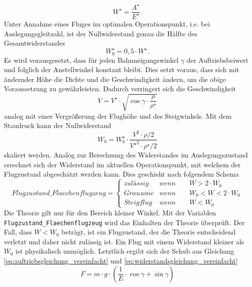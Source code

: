 \begin{equation}
	W^\star = \frac{A^\star}{E^\star} .
\end{equation}
Unter Annahme eines Fluges im optimalen Operationspunkt, i.e. bei Auslegungsgleitzahl, ist der Nullwiderstand genau die Hälfte des Gesamtwiderstandes
\begin{equation}
	W_0^\star = 0,5\cdot W^\star .
\end{equation}
Es wird vorausgesetzt, dass für jeden Bahnneigungswinkel \ensuremath{\gamma} der Auftriebsbeiwert und folglich der Anstellwinkel konstant bleibt. Dies setzt voraus, dass sich mit ändernder Höhe die Dichte und die Geschwindigkeit ändern, um die obige Voraussetzung zu gewährleisten. Dadurch verringert sich die Geschwindigkeit
\begin{equation}
	V = V^\star\cdot\sqrt{\cos\gamma\cdot\frac{\rho}{\rho^\star}}  \label{eq:geschw_flaechenflugzeug}
\end{equation}
analog mit einer Vergrößerung der Flughöhe und des Steigwinkels. Mit dem Staudruck kann der Nullwiderstand 
\begin{equation}
	W_0 = W_0^\star\cdot\frac{V^2\cdot\rho/2}{{V^\star}^2\cdot\rho^\star/2}
\end{equation}
skaliert werden.
Analog zur Berechnung des Widerstandes im Auslegungszustand errechnet sich der Widerstand im aktuellen Operationspunkt, mit welchem der Flugzustand abgeschätzt werden kann. Dies geschieht nach folgendem Schema
\begin{equation}
Flugzustand\_Flaechenflugzeug = \begin{cases} 
zulässig & wenn \qquad W > 2\cdot W_0 \\ 
Grauzone & wenn \qquad W_0 < W < 2\cdot W_0 \\ 
Steigflug & wenn \qquad W < W_0 
\end{cases}
\end{equation} 
Die Theorie gilt nur für den Bereich kleiner Winkel. Mit der Variablen \texttt{Flugzustand\_Flaechenflugzeug} wird das Einhalten der Theorie überprüft. Der Fall, dass \ensuremath{W < W_0} beträgt, ist ein Flugzustand, der die Theorie entscheidend verletzt und daher nicht zulässig ist. Ein Flug mit einem Widerstand kleiner als \ensuremath{W_0} ist physikalisch unmöglich.
Letztlich ergibt sich der Schub aus Gleichung \ref{eq:auftriebsgleichung_vereinfacht} und \ref{eq:widerstandsgleichung_vereinfacht}
\begin{equation}
	F = m\cdot g\cdot (\frac{1}{E}\cdot\cos\gamma + \sin\gamma) \label{eq:schub_flaechenflugzeug}
\end{equation}
